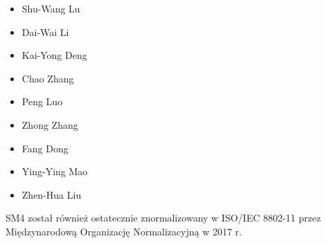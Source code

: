 \begin{itemize}
    \item Shu-Wang Lu
    \item Dai-Wai Li
    \item Kai-Yong Deng
    \item Chao Zhang
    \item Peng Luo
    \item Zhong Zhang 
    \item Fang Dong
    \item Ying-Ying Mao
    \item Zhen-Hua Liu
\end{itemize}


SM4 został również ostatecznie znormalizowany w ISO/IEC 8802-11 przez Międzynarodową Organizację Normalizacyjną w 2017 r.














